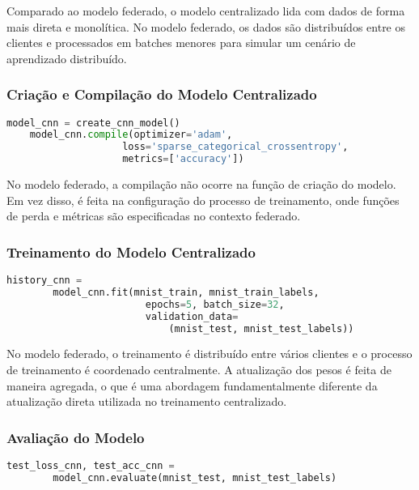 Comparado ao modelo federado, o modelo centralizado lida com dados de forma mais direta e monolítica. No modelo federado, os dados são distribuídos entre os clientes e processados em batches menores para simular um cenário de aprendizado distribuído.

\subsubsection{Criação e Compilação do Modelo Centralizado}

\begin{lstlisting}[language=Python, caption={Criação e compilação do modelo centralizado}, label={lst:centralized_model}]
    model_cnn = create_cnn_model()
    model_cnn.compile(optimizer='adam',
                    loss='sparse_categorical_crossentropy',
                    metrics=['accuracy'])
\end{lstlisting}

No modelo federado, a compilação não ocorre na função de criação do modelo. Em vez disso, é feita na configuração do processo de treinamento, onde funções de perda e métricas são especificadas no contexto federado.

\subsubsection{Treinamento do Modelo Centralizado}

\begin{lstlisting}[language=Python, caption={Treinamento do modelo centralizado}, label={lst:centralized_training}]
    history_cnn = 
        model_cnn.fit(mnist_train, mnist_train_labels,
                        epochs=5, batch_size=32,
                        validation_data=
                            (mnist_test, mnist_test_labels))
\end{lstlisting}

No modelo federado, o treinamento é distribuído entre vários clientes e o processo de treinamento é coordenado centralmente. A atualização dos pesos é feita de maneira agregada, o que é uma abordagem fundamentalmente diferente da atualização direta utilizada no treinamento centralizado.

\subsubsection{Avaliação do Modelo}

\begin{lstlisting}[language=Python, caption={Avaliação do modelo centralizado}, label={lst:centralized_evaluation}]
    test_loss_cnn, test_acc_cnn = 
        model_cnn.evaluate(mnist_test, mnist_test_labels)
\end{lstlisting}

